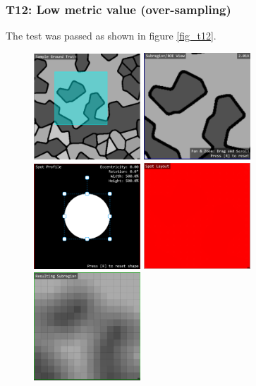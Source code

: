 \documentclass[12pt, titlepage]{article}
\begin{document}
\subsubsection{T12: Low metric value (over-sampling)}
The test was passed as shown in figure \ref{fig_t12}.
\begin{figure}[h!]
  \begin{center}
   \includegraphics[width=4cm]{t10a.png}
   \includegraphics[width=4cm]{t10b.png}
   \includegraphics[width=4cm]{t12c.png}
   \includegraphics[width=4cm]{t12d.png}
   \includegraphics[width=4cm]{t12e.png}

\end{center}
\end{figure}
\end{document}

